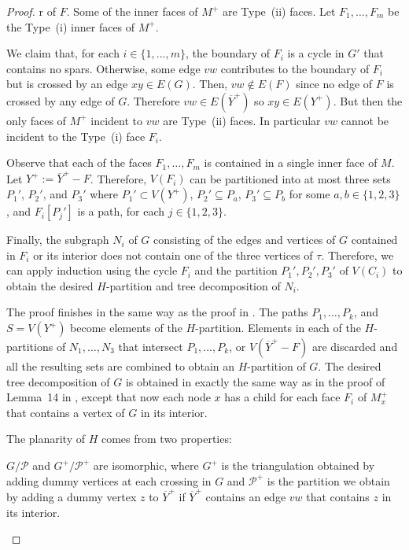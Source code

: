 \documentclass{patmorin}
\newcommand{\note}[2]{\noindent{\color{red}[#1:~#2]}}
\begin{document}
\begin{proof}
r of $F$. Some of the inner faces of $M^+$ are Type~(ii) faces. Let $F_1,\ldots,F_m$ be the Type~(i) inner faces of $M^+$.

	We claim that, for each $i\in\{1,\ldots,m\}$, the boundary of $F_i$ is a cycle in $G'$ that contains no spars. Otherwise, some edge $vw$ contributes to the boundary of $F_i$ but is crossed by an edge $xy\in E(G)$. Then, $vw\not\in E(F)$ since no edge of $F$ is crossed by any edge of $G$. Therefore $vw\in E(\overline{Y}^+)$ so $xy\in E(Y^+)$. But then the only faces of $M^+$ incident to $vw$ are Type~(ii) faces.  In particular $vw$ cannot be incident to the Type~(i) face $F_i$.

	Observe that each of the faces $F_1,\ldots,F_m$ is contained in a single inner face of $M$.   Let $Y^+ := \overline{Y}^+-F$. Therefore, $V(F_i)$ can be partitioned into at most three sets $P_1'$, $P_2'$, and $P_3'$ where $P_1'\subset V(Y^+)$, $P_2'\subseteq P_a$, $P_3'\subseteq P_b$ for some $a,b\in\{1,2,3\}$, and $F_i[P_j']$ is a path, for each $j\in\{1,2,3\}$.

	Finally, the subgraph $N_i$ of $G$ consisting of the edges and vertices of $G$ contained in $F_i$ or its interior does not contain one of the three vertices of $\tau$. Therefore, we can apply induction using the cycle $F_i$ and the partition $P_1',P_2',P_3'$ of $V(C_i)$ to obtain the desired $H$-partition and tree decomposition of $N_i$.

	The proof finishes in the same way as the proof in \cite{DJMMUW20}.  The paths $P_1,\ldots,P_k$, and $S=V(Y^+)$ become elements of the $H$-partition.
	Elements in each of the $H$-partitions of $N_1,\ldots,N_3$ that intersect $P_1,\ldots,P_k$, or $V(\overline{Y}^+-F)$ are discarded and all the resulting sets are combined to obtain an $H$-partition of $G$.  The desired tree decomposition of $G$ is obtained in exactly the same way as in the proof of Lemma~14 in \cite{DJMMUW20}, except that now each node $x$ has a child for each face $F_i$ of $M^+_x$ that contains a vertex of $G$ in its interior.

	\note{DW}{Check whether Lemma~14 is the right lemma}

	The planarity of $H$ comes from two properties:
	\begin{compactenum}
		\item $G/\mathcal{P}$ and $G^+/\mathcal{P^+}$ are isomorphic, where $G^+$ is the triangulation obtained by adding dummy vertices at each crossing in $G$ and $\mathcal{P}^+$ is the partition we obtain by adding a dummy vertex $z$ to $\overline{Y}^+$ if $\overline{Y}^+$ contains an edge $vw$ that contains $z$ in its interior.


\end{compactenum}
\end{proof}
\end{document}
